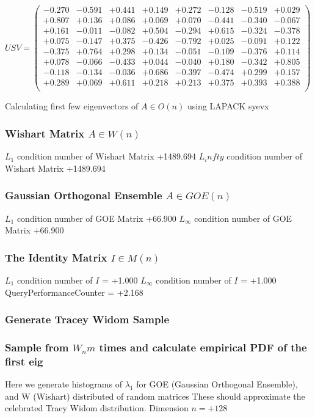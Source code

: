 \documentclass[9pt]{article}
\theoremstyle{plain}
\theoremstyle{definition}
\theoremstyle{remark}
\numberwithin{equation}{section}
\begin{document}
$U S V = \left(
\begin{array}{
cccccccc}
-0.270 & -0.591 & +0.441 & +0.149 & +0.272 & -0.128 & -0.519 & +0.029 \\
+0.807 & +0.136 & +0.086 & +0.069 & +0.070 & -0.441 & -0.340 & -0.067 \\
+0.161 & -0.011 & -0.082 & +0.504 & -0.294 & +0.615 & -0.324 & -0.378 \\
+0.075 & -0.147 & +0.375 & -0.426 & -0.792 & +0.025 & -0.091 & +0.122 \\
-0.375 & +0.764 & +0.298 & +0.134 & -0.051 & -0.109 & -0.376 & +0.114 \\
+0.078 & -0.066 & -0.433 & +0.044 & -0.040 & +0.180 & -0.342 & +0.805 \\
-0.118 & -0.134 & -0.036 & +0.686 & -0.397 & -0.474 & +0.299 & +0.157 \\
+0.289 & +0.069 & +0.611 & +0.218 & +0.213 & +0.375 & +0.393 & +0.388 \\
\end{array}
\right)$ \newline 

Calculating first few eigenvectors of $A \in O(n)$ using LAPACK syevx

\subsubsection{Wishart Matrix $A \in W(n)$}
$L_1$ condition number of Wishart Matrix +1489.694
$L_infty$ condition number of Wishart Matrix +1489.694
\subsubsection{Gaussian Orthogonal Ensemble $A \in GOE(n)$}
$L_1$ condition number of GOE Matrix +66.900
$L_\infty$ condition number of GOE Matrix +66.900
\subsubsection{The Identity Matrix $I \in M(n)$}
$L_1$ condition number of $I$ = +1.000
$L_\infty$ condition number of $I$ = +1.000
QueryPerformanceCounter  =  +2.168
\subsubsection{Generate Tracey Widom Sample}
\subsubsection{Sample from $W_n m$ times and calculate empirical PDF of the first eig}
Here we generate histograms of $\lambda_1$ for GOE (Gaussian Orthogonal Ensemble), and W (Wishart) 		 distributed of random matrices
These should approximate the celebrated Tracy Widom distribution.
Dimension $n = +128$
\end{document}
